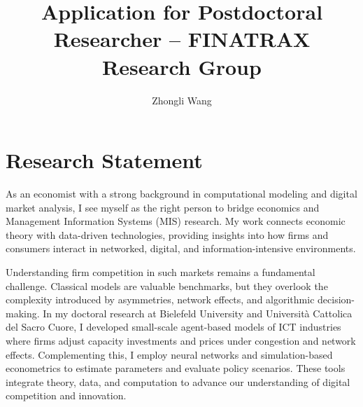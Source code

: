 \documentclass{nfr}
\title{Application for Postdoctoral Researcher – FINATRAX Research Group}
\author{Zhongli Wang}
\begin{document}

% 
% 
% 
% 


\maketitle


\section*{Research Statement}

As an economist with a strong background in computational modeling and digital market analysis, I see myself as the right person to bridge economics and Management Information Systems (MIS) research. My work connects economic theory with data-driven technologies, providing insights into how firms and consumers interact in networked, digital, and information-intensive environments.

Understanding firm competition in such markets remains a fundamental challenge. Classical models are valuable benchmarks, but they overlook the complexity introduced by asymmetries, network effects, and algorithmic decision-making. In my doctoral research at Bielefeld University and Università Cattolica del Sacro Cuore, I developed small-scale agent-based models of ICT industries where firms adjust capacity investments and prices under congestion and network effects. Complementing this, I employ neural networks and simulation-based econometrics to estimate parameters and evaluate policy scenarios. These tools integrate theory, data, and computation to advance our understanding of digital competition and innovation.
\end{document}
